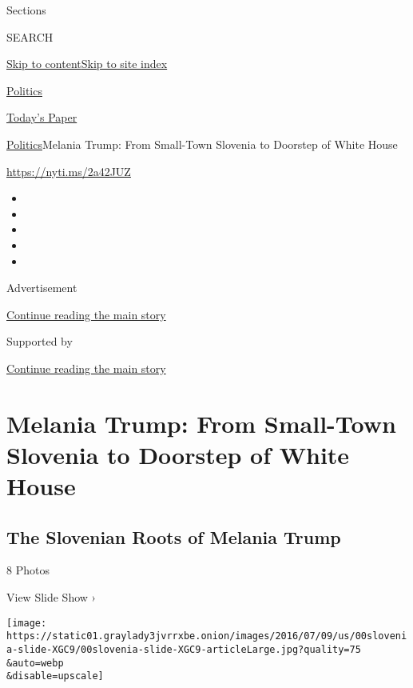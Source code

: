 Sections

SEARCH

\protect\hyperlink{site-content}{Skip to
content}\protect\hyperlink{site-index}{Skip to site index}

\href{https://www.nytimes3xbfgragh.onion/section/politics}{Politics}

\href{https://myaccount.nytimes3xbfgragh.onion/auth/login?response_type=cookie\&client_id=vi}{}

\href{https://www.nytimes3xbfgragh.onion/section/todayspaper}{Today's
Paper}

\href{/section/politics}{Politics}\textbar{}Melania Trump: From
Small-Town Slovenia to Doorstep of White House

\url{https://nyti.ms/2a42JUZ}

\begin{itemize}
\item
\item
\item
\item
\item
\end{itemize}

Advertisement

\protect\hyperlink{after-top}{Continue reading the main story}

Supported by

\protect\hyperlink{after-sponsor}{Continue reading the main story}

\hypertarget{melania-trump-from-small-town-slovenia-to-doorstep-of-white-house}{%
\section{Melania Trump: From Small-Town Slovenia to Doorstep of White
House}\label{melania-trump-from-small-town-slovenia-to-doorstep-of-white-house}}

\href{https://www.nytimes3xbfgragh.onion/slideshow/2016/07/09/us/the-slovenian-roots-of-melania-trump.html}{}

\hypertarget{the-slovenian-roots-of-melania-trump}{%
\subsection{The Slovenian Roots of Melania
Trump}\label{the-slovenian-roots-of-melania-trump}}

8 Photos

View Slide Show ›

\texttt{[image: https://static01.graylady3jvrrxbe.onion/images/2016/07/09/us/00slovenia-slide-XGC9/00slovenia-slide-XGC9-articleLarge.jpg?quality=75\\\&auto=webp\\\&disable=upscale]}

